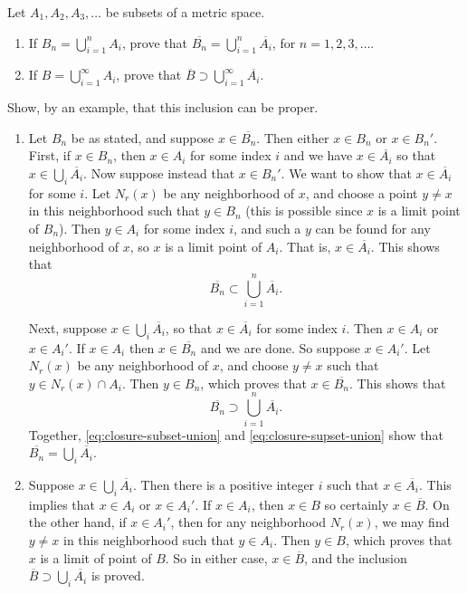  Let $A_1,A_2,A_3,\dots$ be subsets of a metric space.
\begin{enumerate}
\item If $B_n = \bigcup_{i=1}^n A_i$, prove that
  $\overline{B_n} = \bigcup_{i=1}^n \overline{A_i}$, for
  $n = 1,2,3,\dots$.
\item If $B = \bigcup_{i=1}^\infty A_i$, prove that
  $\overline{B}\supset\bigcup_{i=1}^\infty\overline{A_i}$.
\end{enumerate}
Show, by an example, that this inclusion can be proper.
\begin{solution}
  \begin{enumerate}
  \item Let $B_n$ be as stated, and suppose $x\in\overline{B_n}$. Then
    either $x\in B_n$ or $x\in B_n'$. First, if $x\in B_n$, then
    $x\in A_i$ for some index $i$ and we have $x\in\overline{A_i}$ so
    that $x\in\bigcup_i\overline{A_i}$. Now suppose instead that
    $x\in B_n'$. We want to show that $x\in\overline{A_i}$ for some
    $i$. Let $N_r(x)$ be any neighborhood of $x$, and choose a point
    $y\neq x$ in this neighborhood such that $y\in B_n$ (this is
    possible since $x$ is a limit point of $B_n$). Then $y\in A_i$ for
    some index $i$, and such a $y$ can be found for any neighborhood
    of $x$, so $x$ is a limit point of $A_i$. That is,
    $x\in\overline{A_i}$. This shows that
    \begin{equation}
      \label{eq:closure-subset-union}
      \overline{B_n}\subset\bigcup_{i=1}^n\overline{A_i}.
    \end{equation}

    Next, suppose $x\in\bigcup_i\overline{A_i}$, so that
    $x\in\overline{A_i}$ for some index $i$. Then $x\in A_i$ or
    $x\in A_i'$. If $x\in A_i$ then $x\in\overline{B_n}$ and we are
    done. So suppose $x\in A_i'$. Let $N_r(x)$ be any neighborhood of
    $x$, and choose $y\neq x$ such that $y\in N_r(x)\cap A_i$. Then
    $y\in B_n$, which proves that $x\in\overline{B_n}$. This shows that
    \begin{equation}
      \label{eq:closure-supset-union}
      \overline{B_n}\supset\bigcup_{i=1}^n\overline{A_i}.
    \end{equation}
    Together, \eqref{eq:closure-subset-union} and
    \eqref{eq:closure-supset-union} show that
    $\overline{B_n} = \bigcup_i\overline{A_i}$. \qedhere

  \item Suppose $x\in\bigcup_i\overline{A_i}$. Then there is a
    positive integer $i$ such that $x\in\overline{A_i}$. This implies
    that $x\in A_i$ or $x\in A_i'$. If $x\in A_i$, then $x\in B$ so
    certainly $x\in\overline{B}$. On the other hand, if $x\in A_i'$,
    then for any neighborhood $N_r(x)$, we may find $y\neq x$ in this
    neighborhood such that $y\in A_i$. Then $y\in B$, which proves
    that $x$ is a limit of point of $B$. So in either case,
    $x\in\overline{B}$, and the inclusion
    $\overline{B}\supset\bigcup_i\overline{A_i}$ is proved.


\end{enumerate}
\end{solution}
